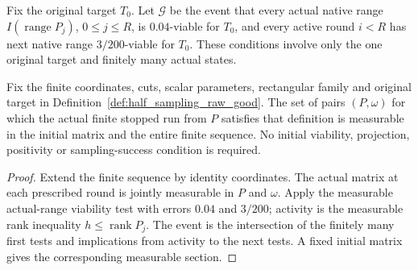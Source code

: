 \begin{definition}
    \label{def:half_sampling_raw_good}
    \leanok
    Fix the original target $T_0$. Let $\mathcal G$ be the event that
    every actual native range $I(\operatorname{range}P_j)$, $0\le j\le R$,
    is $0.04$-viable for $T_0$, and every active round $i<R$ has next
    native range $3/200$-viable for $T_0$. These conditions involve only
    the one original target and finitely many actual states.
\end{definition}

\begin{lemma}
    \label{lem:stopped_half_sampling_raw_joint_measurable}
    \leanok
    Fix the finite coordinates, cuts, scalar parameters, rectangular family
    and original target in Definition~\ref{def:half_sampling_raw_good}.
    The set of pairs $(P,\omega)$ for which the actual finite stopped run
    from $P$ satisfies that definition is measurable in the initial matrix
    and the entire finite sequence. No initial viability, projection,
    positivity or sampling-success condition is required.
\end{lemma}
\begin{proof}\leanok
    Extend the finite sequence by identity coordinates. The actual matrix
    at each prescribed round is jointly measurable in $P$ and $\omega$.
    Apply the measurable actual-range viability test with errors $0.04$
    and $3/200$; activity is the measurable rank inequality
    $h\le\operatorname{rank}P_j$. The event is the intersection of the
    finitely many first tests and implications from activity to the next
    tests. A fixed initial matrix gives the corresponding measurable
    section.
\end{proof}

